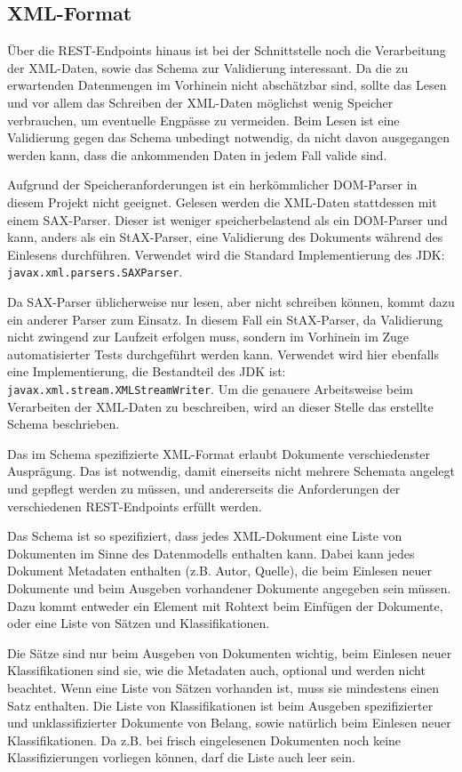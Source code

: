 \subsection{XML-Format}
Über die REST-Endpoints hinaus ist bei der Schnittstelle noch die Verarbeitung
der XML-Daten, sowie das Schema zur Validierung interessant.
Da die zu erwartenden Datenmengen im Vorhinein nicht abschätzbar sind,
sollte das Lesen und vor allem das Schreiben der XML-Daten möglichst wenig Speicher
verbrauchen, um eventuelle Engpässe zu vermeiden. Beim Lesen ist eine Validierung
gegen das Schema unbedingt notwendig, da nicht davon ausgegangen werden kann,
dass die ankommenden Daten in jedem Fall valide sind.

Aufgrund der Speicheranforderungen ist ein herkömmlicher DOM-Parser in diesem Projekt
nicht geeignet. Gelesen werden die XML-Daten stattdessen mit einem SAX-Parser\cite{insel-xml}. Dieser ist weniger speicherbelastend als ein DOM-Parser
und kann, anders als ein StAX-Parser, eine Validierung des Dokuments während
des Einlesens durchführen. Verwendet wird die Standard Implementierung
des JDK: \texttt{javax.xml.parsers.SAXParser}.

Da SAX-Parser üblicherweise nur lesen, aber nicht schreiben können, kommt dazu ein
anderer Parser zum Einsatz. In diesem Fall ein StAX-Parser,
da Validierung nicht zwingend zur Laufzeit erfolgen muss, sondern im Vorhinein
im Zuge automatisierter Tests durchgeführt werden kann.
Verwendet wird hier ebenfalls eine Implementierung, die Bestandteil des JDK ist:
\texttt{javax.xml.stream.XMLStreamWriter}.
Um die genauere Arbeitsweise beim Verarbeiten der XML-Daten zu beschreiben,
wird an dieser Stelle das erstellte Schema beschrieben.

Das im Schema spezifizierte XML-Format erlaubt Dokumente verschiedenster Ausprägung.
Das ist notwendig, damit einerseits nicht mehrere Schemata angelegt und gepflegt
werden zu müssen, und andererseits die Anforderungen der verschiedenen
REST-Endpoints erfüllt werden.

Das Schema ist so spezifiziert, dass jedes XML-Dokument eine Liste von Dokumenten
im Sinne des Datenmodells enthalten kann.
Dabei kann jedes Dokument Metadaten enthalten (z.B. Autor, Quelle), die beim Einlesen
neuer Dokumente und beim Ausgeben vorhandener Dokumente angegeben sein müssen.
Dazu kommt entweder ein Element mit Rohtext beim Einfügen der Dokumente,
oder eine Liste von Sätzen und Klassifikationen.

Die Sätze sind nur beim Ausgeben von Dokumenten wichtig, beim Einlesen
neuer Klassifikationen sind sie, wie die Metadaten auch,
optional und werden nicht beachtet.
Wenn eine Liste von Sätzen vorhanden ist, muss sie mindestens einen Satz enthalten.
Die Liste von Klassifikationen ist beim Ausgeben spezifizierter
und unklassifizierter Dokumente von Belang, sowie natürlich
beim Einlesen neuer Klassifikationen. Da z.B. bei frisch eingelesenen Dokumenten noch keine Klassifizierungen vorliegen können, darf die Liste auch leer sein.

